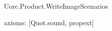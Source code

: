 \begin{lexlean}{Uorc.Product.WriteImageScenarios}
\begin{semanticmodule}
{  axioms: [Quot.sound, propext]
}
\end{semanticmodule}
\end{lexlean}
